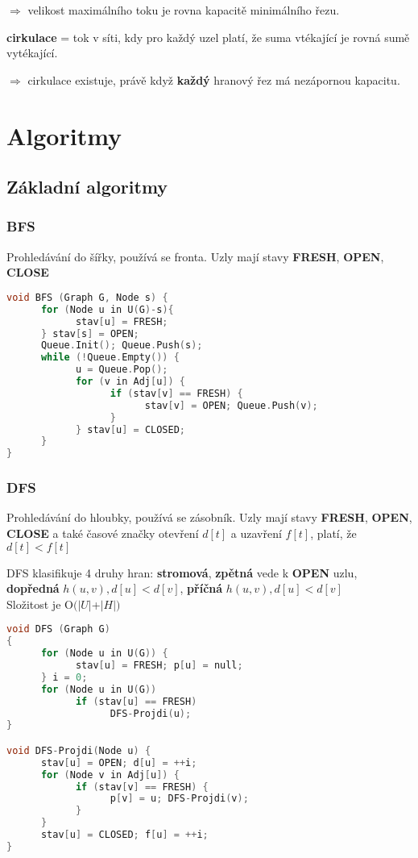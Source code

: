 \documentclass[12pt]{article}
\begin{document}
$\Rightarrow$ velikost maximálního toku je rovna kapacitě minimálního řezu.

\noindent
\textbf{cirkulace} = tok v síti, kdy pro každý uzel platí, že suma vtékající je rovná sumě vytékající.

$\Rightarrow$ cirkulace existuje, právě když \textbf{každý} hranový řez má nezápornou kapacitu.
\cleardoublepage

\section{Algoritmy}
\subsection{Základní algoritmy}
\subsubsection{BFS}
Prohledávání do šířky, používá se fronta. Uzly mají stavy \textbf{FRESH}, \textbf{OPEN}, \textbf{CLOSE}

\begin{lstlisting}[language=c]
void BFS (Graph G, Node s) {
      for (Node u in U(G)-s){ 
            stav[u] = FRESH; 
      } stav[s] = OPEN; 
      Queue.Init(); Queue.Push(s);
      while (!Queue.Empty()) {
            u = Queue.Pop();
            for (v in Adj[u]) {
                  if (stav[v] == FRESH) {
                        stav[v] = OPEN; Queue.Push(v);
                  } 
            } stav[u] = CLOSED;
      }
}
\end{lstlisting}

\subsubsection{DFS}
Prohledávání do hloubky, používá se zásobník. Uzly mají stavy \textbf{FRESH}, \textbf{OPEN}, \textbf{CLOSE} a také časové značky otevření $d[t]$ a uzavření $f[t]$, platí, že $d[t] < f[t]$

DFS klasifikuje 4 druhy hran: \textbf{stromová}, \textbf{zpětná} vede k \textbf{OPEN} uzlu, \textbf{dopředná} $h(u, v), d[u] < d[v]$, \textbf{příčná} $h(u, v), d[u] < d[v]$\\
Složitost je $\textrm{O}(\left|U\right|$+$\left|H\right|)$

\begin{lstlisting}[language=c]
void DFS (Graph G) 
{
      for (Node u in U(G)) {
            stav[u] = FRESH; p[u] = null; 
      } i = 0;
      for (Node u in U(G))
            if (stav[u] == FRESH)
                  DFS-Projdi(u);
}

void DFS-Projdi(Node u) {
      stav[u] = OPEN; d[u] = ++i;
      for (Node v in Adj[u]) {
            if (stav[v] == FRESH) {
                  p[v] = u; DFS-Projdi(v); 
            }
      }
      stav[u] = CLOSED; f[u] = ++i;
}
\end{lstlisting}
\end{document}
